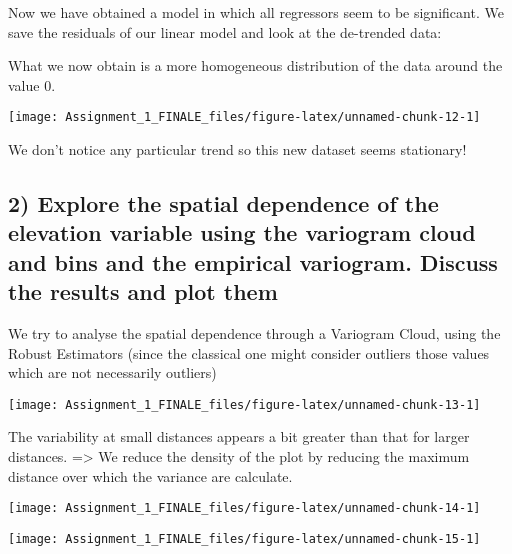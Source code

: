 \documentclass[
]{article}
\begin{document}
Now we have obtained a model in which all regressors seem to be
significant. We save the residuals of our linear model and look at the
de-trended data:

What we now obtain is a more homogeneous distribution of the data around
the value 0.

\begin{center}\texttt{[image: Assignment\_1\_FINALE\_files/figure-latex/unnamed-chunk-12-1]} \end{center}

We don't notice any particular trend so this new dataset seems
stationary!

\newpage

\hypertarget{explore-the-spatial-dependence-of-the-elevation-variable-using-the-variogram-cloud-and-bins-and-the-empirical-variogram.-discuss-the-results-and-plot-them}{%
\subsection{2) Explore the spatial dependence of the elevation variable
using the variogram cloud and bins and the empirical variogram. Discuss
the results and plot
them}\label{explore-the-spatial-dependence-of-the-elevation-variable-using-the-variogram-cloud-and-bins-and-the-empirical-variogram.-discuss-the-results-and-plot-them}}

We try to analyse the spatial dependence through a Variogram Cloud,
using the Robust Estimators (since the classical one might consider
outliers those values which are not necessarily outliers)

\begin{center}\texttt{[image: Assignment\_1\_FINALE\_files/figure-latex/unnamed-chunk-13-1]} \end{center}

The variability at small distances appears a bit greater than that for
larger distances. =\textgreater{} We reduce the density of the plot by
reducing the maximum distance over which the variance are calculate.

\begin{center}\texttt{[image: Assignment\_1\_FINALE\_files/figure-latex/unnamed-chunk-14-1]} \end{center}

\begin{center}\texttt{[image: Assignment\_1\_FINALE\_files/figure-latex/unnamed-chunk-15-1]} \end{center}
\end{document}
